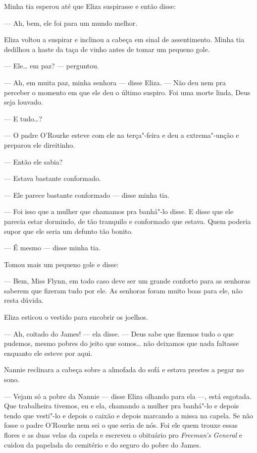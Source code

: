 Minha tia esperou até que Eliza suspirasse e então disse:

--- Ah, bem, ele foi para um mundo melhor.

Eliza voltou a suspirar e inclinou a cabeça em sinal de assentimento.
Minha tia dedilhou a haste da taça de vinho antes de tomar um pequeno gole.

--- Ele\ldots{} em paz? --- perguntou.

--- Ah, em muita paz, minha senhora --- disse Eliza.  --- Não deu nem pra
perceber o momento em que ele deu o último suspiro.  Foi uma morte linda, Deus
seja louvado.

--- E tudo\ldots{}?

--- O padre O’Rourke esteve com ele na terça"-feira e deu a extrema"-unção e
preparou ele direitinho.

--- Então ele sabia?

--- Estava bastante conformado.

--- Ele parece bastante conformado --- disse minha tia.

--- Foi isso que a mulher que chamamos pra banhá"-lo disse.  E disse que ele
parecia estar dormindo, de tão tranquilo e conformado que estava.  Quem poderia
supor que ele seria um defunto tão bonito.

--- É mesmo --- disse minha tia.

Tomou mais um pequeno gole e disse:

--- Bem, Miss Flynn, em todo caso deve ser um grande conforto para as
senhoras saberem que fizeram tudo por ele.  As senhoras foram muito boas para
ele, não resta dúvida.

Eliza esticou o vestido para encobrir os joelhos.

--- Ah, coitado do James! --- ela disse.  --- Deus sabe que fizemos tudo o que
pudemos, mesmo pobres do jeito que somos\ldots{} não deixamos que nada faltasse
enquanto ele esteve por aqui.

Nannie reclinara a cabeça sobre a almofada do sofá e estava prestes a pegar no
sono.

--- Vejam só a pobre da Nannie --- disse Eliza olhando para ela ---, está
esgotada.  Que trabalheira tivemos, eu e ela, chamando a mulher pra banhá"-lo e
depois tendo que vesti"-lo e depois o caixão e depois marcando a missa na
capela.  Se não fosse o padre O’Rourke nem sei o que seria de nós.  Foi ele
quem trouxe essas flores e as duas velas da capela e escreveu o obituário pro
\textit{Freeman’s General} e cuidou da papelada do cemitério e do seguro do
pobre do James.

